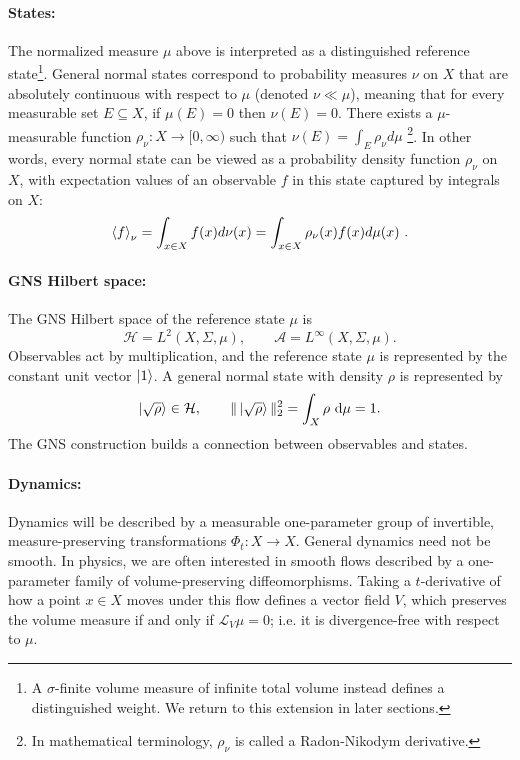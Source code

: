 \documentclass[a4paper,11pt]{article}
\theoremstyle{definition}
\newcommand{\dd}{\,\mathrm{d}}
\newcommand{\cH}{\mathcal{H}}
\newcommand{\mA}{\mathcal{A}}
\begin{document}
\paragraph{States:} The normalized measure $\mu$ above is interpreted as a distinguished reference state\footnote{A $\sigma$-finite volume measure of infinite total volume instead defines a distinguished weight. We return to this extension in later sections.}. General normal states correspond to probability measures $\nu$ on $X$ that are absolutely continuous with respect to $\mu$ (denoted $\nu\ll \mu$), meaning that for every measurable set $E\subseteq X$, if $\mu(E)=0$ then $\nu(E)=0$.
There exists a $\mu$-measurable function $\rho_\nu:X\to [0,\infty)$ such that $\nu(E)=\int_E \rho_\nu d\mu$ \footnote{In mathematical terminology, $\rho_\nu$ is called a Radon-Nikodym derivative.}. In other words, every normal state can be viewed as a probability density function $\rho_\nu$ on $X$, with expectation values of an observable $f$ in this state captured by integrals on $X$: 
\begin{align}
\braket{f}_\nu=\int_{x\in X}f(x) d\nu(x)=\int_{x\in X} \rho_\nu(x) f(x) d\mu(x)\ .
\end{align}

\paragraph{GNS Hilbert space:} The GNS Hilbert space of the reference state $\mu$ is
\[
  \cH=L^2(X,\Sigma,\mu),
  \qquad
  \mA=L^\infty(X,\Sigma,\mu).
\]
Observables act by multiplication, and the reference state $\mu$ is represented by the constant unit vector $\ket{1}$. A general normal state with density $\rho$ is represented by
\[
  \ket{\sqrt{\rho}}\in\cH,
  \qquad
  \|\ket{\sqrt{\rho}}\|_2^2=\int_X\rho\,\dd\mu=1.
\]
The GNS construction builds a connection between observables and states.


\paragraph{Dynamics:} Dynamics will be described by a measurable one-parameter group of invertible, measure-preserving transformations $\Phi_t:X\to X$. General dynamics need not be smooth. In physics, we are often interested in smooth flows described by a one-parameter family of volume-preserving diffeomorphisms. Taking a $t$-derivative of how a point $x\in X$ moves under this flow defines a vector field $V$, which preserves the volume measure if and only if $\mathcal{L}_V\mu=0$; i.e. it is divergence-free with respect to $\mu$. 
\end{document}
